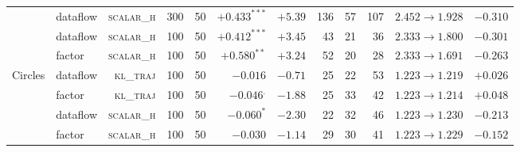 \begin{table}[t]
\begin{tabular}{@{}llrrrrrrrrrr@{}}
  & dataflow & \textsc{scalar\_h}  & 300 & 50 & $+0.433^{***}$  & $+5.39$ &136 & 57 & 107 & $2.452{\to}1.928$ & $-0.310$ \\
  & dataflow & \textsc{scalar\_h}  & 100 & 50 & $+0.412^{***}$  & $+3.45$ & 43 & 21 &  36 & $2.333{\to}1.800$ & $-0.301$ \\
  & factor   & \textsc{scalar\_h}  & 100 & 50 & $+0.580^{**}$   & $+3.24$ & 52 & 20 &  28 & $2.333{\to}1.691$ & $-0.263$ \\
\midrule
\multirow{4}{*}{Circles}
  & dataflow & \textsc{kl\_traj}   & 100 & 50 & $-0.016$        & $-0.71$ & 25 & 22 &  53 & $1.223{\to}1.219$ & $+0.026$ \\
  & factor   & \textsc{kl\_traj}   & 100 & 50 & $-0.046^{.}$    & $-1.88$ & 25 & 33 &  42 & $1.223{\to}1.214$ & $+0.048$ \\
  & dataflow & \textsc{scalar\_h}  & 100 & 50 & $-0.060^{*}$    & $-2.30$ & 22 & 32 &  46 & $1.223{\to}1.230$ & $-0.213$ \\
  & factor   & \textsc{scalar\_h}  & 100 & 50 & $-0.030$        & $-1.14$ & 29 & 30 &  41 & $1.223{\to}1.229$ & $-0.152$ \\
\bottomrule
\end{tabular}
\end{table}

